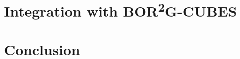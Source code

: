 \documentclass[11pt]{article}
\begin{document}
	\newpage
	\section{Integration with BOR\textsuperscript{2}G-CUBES}
	
	\newpage
	\section{Conclusion}

	\newpage
	
	
\end{document}
